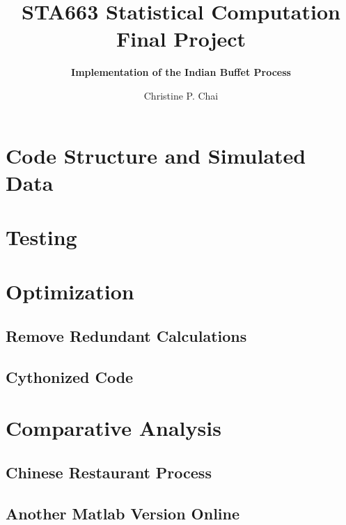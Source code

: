 \documentclass[11pt]{article}
\begin{document}
\vspace{-1in}
\title{\bf STA663 Statistical Computation Final Project}
\author{\bf Implementation of the Indian Buffet Process}
\date{Christine P. Chai}
\maketitle 
\vspace{-0.5in}



\section{Code Structure and Simulated Data}

\section{Testing}

\section{Optimization}

\subsection{Remove Redundant Calculations}

\subsection{Cythonized Code}

\section{Comparative Analysis}

\subsection{Chinese Restaurant Process}

\subsection{Another Matlab Version Online}
\end{document}
